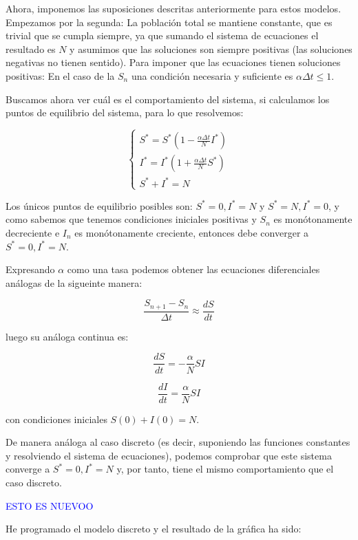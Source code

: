 Ahora, imponemos las suposiciones descritas anteriormente para estos modelos. Empezamos por la segunda: La población total se mantiene constante, que es trivial que se cumpla siempre, ya que sumando el sistema de ecuaciones el resultado es $N$ y asumimos que las soluciones son siempre positivas (las soluciones negativas no tienen sentido).
Para imponer que las ecuaciones tienen soluciones positivas:
En el caso de la $S_n$ una condición necesaria y suficiente es $\alpha\Delta t \leq 1$. 

Buscamos ahora ver cuál es el comportamiento del sistema, si calculamos los puntos de equilibrio del sistema, para lo que resolvemos:

$$
\begin{cases}
S^*=S^*\left( 1-\frac{\alpha\Delta t}{N}I^*\right) \\
I^*=I^*\left( 1+\frac{\alpha\Delta t}{N}S^*\right) \\
S^*+I^*=N
\end{cases}
$$

Los únicos puntos de equilibrio posibles son: $S^*=0, I^*=N$ y $S^*=N, I^*=0$, y como sabemos que tenemos condiciones iniciales positivas y $S_n$ es monótonamente decreciente e $I_n$ es monótonamente creciente, entonces debe converger a $S^*=0, I^*=N$.

Expresando $\alpha$ como una tasa podemos obtener las ecuaciones diferenciales análogas de la sigueinte manera:

$$\frac{S_{n+1} - S_n}{\Delta t} \approx \frac{dS}{dt}$$

luego su análoga continua es:

\begin{equation}
\frac{dS}{dt} = -\frac{\alpha}{N}SI
\end{equation}


\begin{equation}
\frac{dI}{dt} = \frac{\alpha}{N}SI
\end{equation}

con condiciones iniciales $S(0)+I(0)=N$.

De manera análoga al caso discreto (es decir, suponiendo las funciones constantes y resolviendo el sistema de ecuaciones), podemos comprobar que este sistema converge a $S^*=0, I^*=N$ y, por tanto, tiene el mismo comportamiento que el caso discreto.

\textcolor{blue}{ESTO ES NUEVOO}

He programado el modelo discreto y el resultado de la gráfica ha sido:

